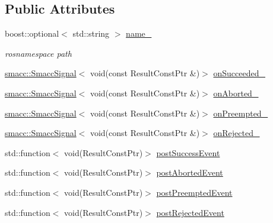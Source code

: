 \subsection*{Public Attributes}
\begin{DoxyCompactItemize}
\item 
boost\+::optional$<$ std\+::string $>$ \hyperlink{classsmacc_1_1client__bases_1_1SmaccActionClientBase_a12b007d3c3657b0f0699e97cdb96a490}{name\+\_\+}
\begin{DoxyCompactList}\small\item\em rosnamespace path \end{DoxyCompactList}\item 
\hyperlink{classsmacc_1_1SmaccSignal}{smacc\+::\+Smacc\+Signal}$<$ void(const Result\+Const\+Ptr \&)$>$ \hyperlink{classsmacc_1_1client__bases_1_1SmaccActionClientBase_afa1d615e16c9e825d815a3a3ccaa61df}{on\+Succeeded\+\_\+}
\item 
\hyperlink{classsmacc_1_1SmaccSignal}{smacc\+::\+Smacc\+Signal}$<$ void(const Result\+Const\+Ptr \&)$>$ \hyperlink{classsmacc_1_1client__bases_1_1SmaccActionClientBase_adc33748ca4fcef9730f8039b75d496d0}{on\+Aborted\+\_\+}
\item 
\hyperlink{classsmacc_1_1SmaccSignal}{smacc\+::\+Smacc\+Signal}$<$ void(const Result\+Const\+Ptr \&)$>$ \hyperlink{classsmacc_1_1client__bases_1_1SmaccActionClientBase_a23846f928b48b5da809690883044b14b}{on\+Preempted\+\_\+}
\item 
\hyperlink{classsmacc_1_1SmaccSignal}{smacc\+::\+Smacc\+Signal}$<$ void(const Result\+Const\+Ptr \&)$>$ \hyperlink{classsmacc_1_1client__bases_1_1SmaccActionClientBase_a4c878cbf2684701323e2b36668f7d721}{on\+Rejected\+\_\+}
\item 
std\+::function$<$ void(Result\+Const\+Ptr)$>$ \hyperlink{classsmacc_1_1client__bases_1_1SmaccActionClientBase_afb4f82508cd653d496392f321e84a783}{post\+Success\+Event}
\item 
std\+::function$<$ void(Result\+Const\+Ptr)$>$ \hyperlink{classsmacc_1_1client__bases_1_1SmaccActionClientBase_a9ca2952ededeec233ee6d8a9a39c680b}{post\+Aborted\+Event}
\item 
std\+::function$<$ void(Result\+Const\+Ptr)$>$ \hyperlink{classsmacc_1_1client__bases_1_1SmaccActionClientBase_a9513e302d447b04aafbca574d37a9ecc}{post\+Preempted\+Event}
\item 
std\+::function$<$ void(Result\+Const\+Ptr)$>$ \hyperlink{classsmacc_1_1client__bases_1_1SmaccActionClientBase_a04cb60c48127e5534c1ce7045fb5abdc}{post\+Rejected\+Event}
\item 

\end{DoxyCompactItemize}
